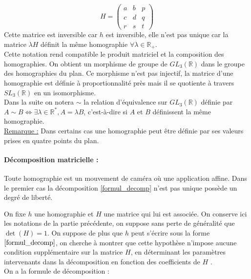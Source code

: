 	\begin{equation*}
	H=\begin{pmatrix}
	a&b&p\\c&d&q\\r&s&t
	\end{pmatrix}
	\end{equation*}
	Cette matrice est inversible car $h$ est inversible, elle n'est pas unique car la matrice $\lambda H$ définit la même homographie $\forall \lambda \in \mathbb{R}_+$.\\
Cette notation rend compatible le produit matriciel et la composition des homographies. On obtient un morphisme de groupe de $GL_{3}(\mathbb{R})$ dans le groupe des homographies du plan. Ce morphisme n'est pas injectif, la matrice d'une homographie est définie à proportionnalité près mais il se quotiente à travers $SL_{3}(\mathbb{R})$ en un isomorphisme.\\
Dans la suite on notera $\sim$ la relation d'équivalence  sur $GL_{3}(\mathbb{R})$ définie par $A\sim B \iff \exists \lambda\in \mathbb{R}^{*} , A=\lambda B$, c'est-à-dire si $A$ et $B$ définissent la même homographie.\\
\underline{Remarque :} Dans certains cas une homographie peut être définie par ses valeurs prises en quatre points du plan.\\



\paragraph{Décomposition matricielle :}
\begin{prop}
Toute homographie est un mouvement de caméra où une application affine. Dans le premier cas la décomposition \ref{formul_decomp} n'est pas unique possède un degré de liberté.
\end{prop}
On fixe $h$ une homographie et $H$ une matrice qui lui est associée. On conserve ici les notations de la partie précédente, on suppose sans perte de généralité que $\det (H)=1$. On suppose de plus que $h$ peut s'écrire sous la forme $\ref{formul_decomp}$, on cherche à montrer que cette hypothèse n'impose aucune condition supplémentaire sur la matrice $H$, en déterminant les paramètres intervenants dans la décomposition en fonction des coefficients de $H$ .\\
On a la formule de décomposition :

